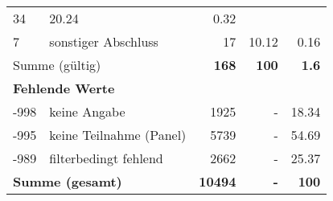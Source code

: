 \begin{longtable}{lXrrr}
       \num{34} &
       \num[round-mode=places,round-precision=2]{20.24} &
         \num[round-mode=places,round-precision=2]{0.32} \\

     7 &
     \multicolumn{1}{X}{ sonstiger Abschluss   } &


       \num{17} &
       \num[round-mode=places,round-precision=2]{10.12} &
         \num[round-mode=places,round-precision=2]{0.16} \\
     \midrule
     \multicolumn{2}{l}{Summe (gültig)} &
       \textbf{\num{168}} &
     \textbf{\num{100}} &
       \textbf{\num[round-mode=places,round-precision=2]{1.6}} \\
     \multicolumn{5}{l}{\textbf{Fehlende Werte}}\\
       -998 &
       keine Angabe &
         \num{1925} &
        - &
         \num[round-mode=places,round-precision=2]{18.34} \\
       -995 &
       keine Teilnahme (Panel) &
         \num{5739} &
        - &
         \num[round-mode=places,round-precision=2]{54.69} \\
       -989 &
       filterbedingt fehlend &
         \num{2662} &
        - &
         \num[round-mode=places,round-precision=2]{25.37} \\
     \midrule
     \multicolumn{2}{l}{\textbf{Summe (gesamt)}} &
          \textbf{\num{10494}} &
        \textbf{-} &
        \textbf{\num{100}} \\
     \bottomrule
     \end{longtable}
     
